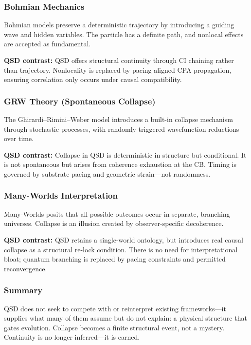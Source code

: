 \documentclass[preprints,article,submit,pdftex,moreauthors]{Definitions/mdpi}
\begin{document}
\subsubsection{Bohmian Mechanics}
Bohmian models preserve a deterministic trajectory by introducing a guiding wave and hidden variables. The particle has a definite path, and nonlocal effects are accepted as fundamental.

\textbf{QSD contrast:} QSD offers structural continuity through CI chaining rather than trajectory. Nonlocality is replaced by pacing-aligned CPA propagation, ensuring correlation only occurs under causal compatibility.

\subsubsection{GRW Theory (Spontaneous Collapse)}
The Ghirardi–Rimini–Weber model introduces a built-in collapse mechanism through stochastic processes, with randomly triggered wavefunction reductions over time.

\textbf{QSD contrast:} Collapse in QSD is deterministic in structure but conditional. It is not spontaneous but arises from coherence exhaustion at the CB. Timing is governed by substrate pacing and geometric strain—not randomness.

\subsubsection{Many-Worlds Interpretation}
Many-Worlds posits that all possible outcomes occur in separate, branching universes. Collapse is an illusion created by observer-specific decoherence.

\textbf{QSD contrast:} QSD retains a single-world ontology, but introduces real causal collapse as a structural re-lock condition. There is no need for interpretational bloat; quantum branching is replaced by pacing constraints and permitted reconvergence.

\subsubsection{Summary}
QSD does not seek to compete with or reinterpret existing frameworks—it supplies what many of them assume but do not explain: a physical structure that gates evolution. Collapse becomes a finite structural event, not a mystery. Continuity is no longer inferred—it is earned.


\isPreprints{}{%
\begin{adjustwidth}{-\extralength}{0cm}
} %
\end{document}
